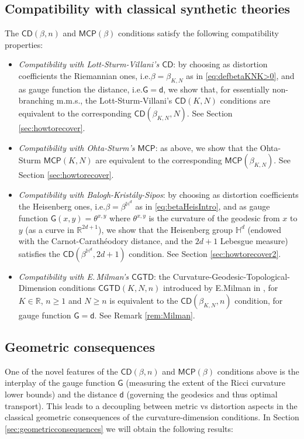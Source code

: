 \documentclass[11pt,a4paper]{article}
\theoremstyle{plain}
\theoremstyle{definition}
\theoremstyle{remark}
\numberwithin{equation}{section}
\newcommand{\R}{\mathbb{R}} %
\renewcommand{\H}{\mathbb{H}}
\newcommand{\CD}{\mathsf{CD}}
\newcommand{\MCP}{\mathsf{MCP}}
\newcommand{\sfd}{\mathsf d}
\newcommand{\sfG}{\mathsf G}
\begin{document}
\subsection*{Compatibility with classical synthetic theories} 
The $\CD(\beta,n)$ and $\MCP(\beta)$ conditions satisfy the following compatibility properties:
\begin{itemize}
\item \emph{Compatibility  with Lott-Sturm-Villani's $\CD$}: by choosing as distortion coefficients the Riemannian ones, i.e.\@ $\beta=\beta_{K,N}$ as in \eqref{eq:defbetaKNK>0},  and as gauge function the distance, i.e.\@ $\sfG=\sfd$,  we show that, for essentially non-branching m.m.s., the Lott-Sturm-Villani's $\CD(K,N)$ conditions are equivalent to the corresponding $\CD(\beta_{K,N}, N)$. See Section \ref{sec:howtorecover}.
\item \emph{Compatibility with Ohta-Sturm's $\MCP$}: as above, we show that the Ohta-Sturm   $\MCP(K,N)$  are equivalent to the corresponding $\MCP(\beta_{K,N})$. See Section \ref{sec:howtorecover}.
\item  \emph{Compatibility  with Balogh-Krist\'aly-Sipos}:  by choosing as distortion coefficients the Heisenberg ones, i.e.\@ $\beta=\beta^{\H^d}$ as in \eqref{eq:betaHeisIntro},  and as gauge function $\sfG(x,y)=\theta^{x,y}$ where $\theta^{x,y}$ is the curvature of the geodesic from $x$ to $y$ (as a curve in $\R^{2d+1}$), we show that the Heisenberg group $\H^d$ (endowed with the Carnot-Carath\'eodory distance, and the $2d+1$ Lebesgue measure) satisfies the $\CD(\beta^{\H^d}, 2d+1)$ condition. See Section \ref{sec:howtorecover2}.
\item \emph{Compatibility with E.\,Milman's $\mathsf{CGTD}$}:  the Curvature-Geodesic-Topological-Di\-men\-sion conditions $\mathsf{CGTD}(K,N,n)$ introduced by E.\@ Milman in \cite[Sec.\@ 7]{MilmanSR}, for $K\in \R$, $n\geq 1$ and $N\geq n$ is equivalent to the $\CD(\beta_{K,N},n)$ condition, for gauge function $\sfG=\sfd$. See Remark \ref{rem:Milman}.
\end{itemize}



\subsection*{Geometric consequences} 
One of the novel features of the $\CD(\beta,n)$ and $\MCP(\beta)$ conditions above is the interplay of the gauge function $\sfG$ (measuring the extent of the Ricci curvature lower bounds) and the distance $\sfd$ (governing the geodesics and thus optimal transport). This leads to a decoupling between metric vs distortion aspects in the classical geometric consequences of the curvature-dimension conditions. In Section \ref{sec:geometricconsequences} we will obtain the following results:
\end{document}
